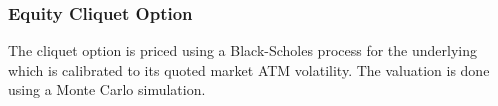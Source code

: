 \subsubsection{Equity Cliquet Option}
\label{pricing::eq_cliquetoption}

The cliquet option is priced using a Black-Scholes process for the underlying 
which is calibrated to its quoted market ATM volatility. The valuation is 
done using a Monte Carlo simulation.
